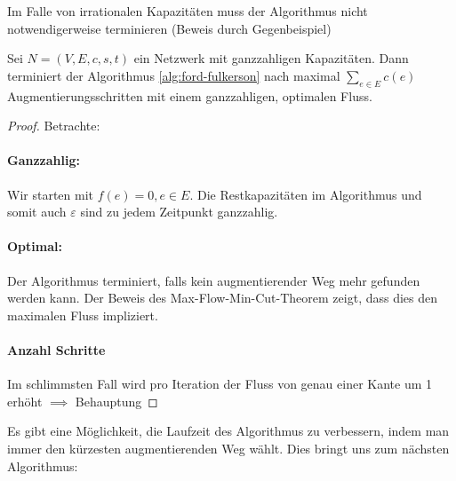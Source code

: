 \begin{remark}
Im Falle von irrationalen Kapazitäten muss der Algorithmus nicht notwendigerweise terminieren (Beweis durch Gegenbeispiel)
\end{remark}
\begin{theorem}
Sei $N=(V,E,c,s,t)$ ein Netzwerk mit ganzzahligen Kapazitäten. Dann terminiert der Algorithmus \ref{alg:ford-fulkerson} nach maximal $\sum_{e \in E}c(e)$ Augmentierungsschritten mit einem ganzzahligen, optimalen Fluss.
\end{theorem}
\begin{proof} Betrachte:
\paragraph{Ganzzahlig:} Wir starten mit $f(e)=0, e \in E$. Die Restkapazitäten im Algorithmus und somit auch $\varepsilon $ sind zu jedem Zeitpunkt ganzzahlig.
\paragraph{Optimal:} Der Algorithmus terminiert, falls kein augmentierender Weg mehr gefunden werden kann. Der Beweis des Max-Flow-Min-Cut-Theorem zeigt, dass dies den maximalen Fluss impliziert.
\paragraph{Anzahl Schritte} Im schlimmsten Fall wird pro Iteration der Fluss von genau einer Kante um 1 erhöht $\implies$ Behauptung 
\end{proof}

Es gibt eine Möglichkeit, die Laufzeit des Algorithmus zu verbessern, indem man immer den kürzesten augmentierenden Weg wählt. Dies bringt uns zum nächsten Algorithmus:

